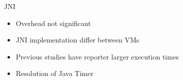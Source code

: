 \documentclass[xcolor={table}]{beamer}
\newcommand{\tikzmark}[1]{\tikz[overlay,remember picture] \node (#1) {};}
\begin{document}

\begin{frame}{JNI}
    \begin{itemize}
        \item Overhead not significant
        \item JNI implementation differ between VMs
        \item Previous studies have reporter larger execution times
        \item Resolution of Java Timer
    \end{itemize}
\end{frame}
\end{document}
